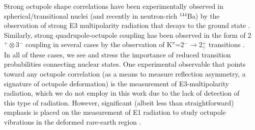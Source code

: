 Strong octupole shape correlations have been experimentally observed in spherical/transitional nuclei (and recently in neutron-rich $^{144}$Ba) by the observation of strong E3 multipolarity radiation that decays to the ground state \cite{Bucher_Octupole144Ba_2016,Garrett_2009_negShapeCoex}. Similarly, strong quadrupole-octupole coupling has been observed in the form of 2$^+\otimes$3$^-$ coupling in several cases by the observation of K$^\pi$=2$^-\rightarrow$2$^+_\gamma$ transitions \cite{Pascu_octupole_2015,Spiecker_E1strength,Soloviev_QuadHex}. In all of these cases, we see and stress the importance of reduced transition probabilities connecting nuclear states. One experimental observable that points toward any octupole correlation (as a means to measure reflection asymmetry, a signature of octupole deformation) is the measurement of E3-multipolarity radiation, which we do not employ in this work due to the lack of detection of this type of radiation. However, significant (albeit less than straightforward) emphasis is placed on the measurement of E1 radiation to study octupole vibrations in the deformed rare-earth region \cite{Pascu_octupole_2015,Soloviev_QuadHex}. 


